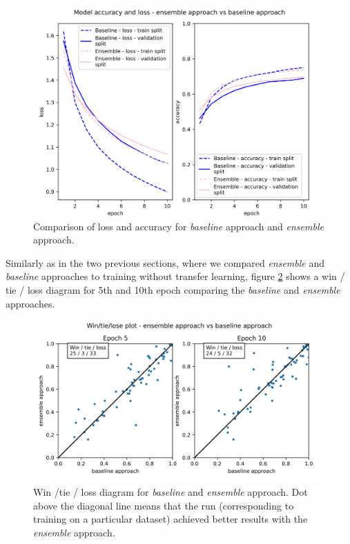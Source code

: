 \documentclass[a4paper,11pt,twoside]{report}
\theoremstyle{definition}
\begin{document}
\FloatBarrier
\begin{figure}[h!t]
\centering
\includegraphics[width=15.5cm]{imgs/baseline_vs_ensemble/loss_acc.png}
\caption{Comparison of loss and accuracy for\textit{ baseline }approach and\textit{ ensemble }approach. }
\label{fig:baseline_vs_ensemble}
\end{figure}
\FloatBarrier
Similarly as in the two previous sections, where we compared \textit{ensemble} and \textit{baseline} approaches to training without transfer learning, figure \ref{fig:win_tie_loss_baseline_vs_ensemble} shows a win / tie / loss diagram for 5th and 10th epoch comparing the \textit{baseline} and \textit{ensemble} approaches.

\FloatBarrier
\begin{figure}[h!t]
\centering
\includegraphics[width=17cm]{imgs/baseline_vs_ensemble/win_tie_lose_epoch.png}
\caption{Win /tie / loss diagram  for\textit{ baseline } and\textit{ ensemble }approach. Dot above the diagonal line means that the run (corresponding to training on a particular dataset)  achieved better results with the \textit{ensemble} approach.}
\label{fig:win_tie_loss_baseline_vs_ensemble}
\end{figure}
\FloatBarrier
\end{document}

